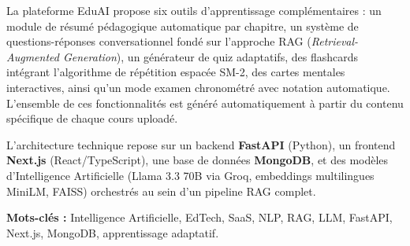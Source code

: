 \documentclass[12pt, a4paper, oneside]{report}
\begin{document}
La plateforme EduAI propose six outils d'apprentissage complémentaires : un module de résumé pédagogique automatique par chapitre, un système de questions-réponses conversationnel fondé sur l'approche RAG (\textit{Retrieval-Augmented Generation}), un générateur de quiz adaptatifs, des flashcards intégrant l'algorithme de répétition espacée SM-2, des cartes mentales interactives, ainsi qu'un mode examen chronométré avec notation automatique. L'ensemble de ces fonctionnalités est généré automatiquement à partir du contenu spécifique de chaque cours uploadé.

L'architecture technique repose sur un backend \textbf{FastAPI} (Python), un frontend \textbf{Next.js} (React/TypeScript), une base de données \textbf{MongoDB}, et des modèles d'Intelligence Artificielle (Llama 3.3 70B via Groq, embeddings multilingues MiniLM, FAISS) orchestrés au sein d'un pipeline RAG complet.

\vspace{0.5cm}
\textbf{Mots-clés :} Intelligence Artificielle, EdTech, SaaS, NLP, RAG, LLM, FastAPI, Next.js, MongoDB, apprentissage adaptatif.

\newpage

\tableofcontents
\newpage

\listoffigures
{}
\newpage

\listoftables
{}
\newpage

\end{document}
